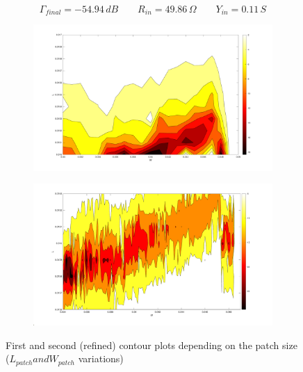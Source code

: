 \documentclass[12pt,a4paper]{article}
\begin{document}
{	\begin{equation*}
		\Gamma_{final}=-54.94\,dB\qquad R_{in}=49.86\,\Omega\qquad Y_{in}=0.11\,S
	\end{equation*}
	\begin{figure}[h]
		\begin{center}
			\begin{subfigure}{0.5\linewidth}
				\includegraphics[scale=0.25]{First_Contour_LOG.pdf}
			\end{subfigure}
			\begin{subfigure}{0.5\linewidth}
				\includegraphics[scale=0.25]{Second_Contour_LOG.pdf}
			\end{subfigure}
			\caption{\selectfont
				\color{gray}First and second (refined) contour plots depending on the patch size ($L_{patch} and W_{patch}$ variations)}
		\end{center}  
	\end{figure}
	\begin{figure}[h]
		\begin{center}

\end{center}
\end{figure}}
\end{document}

